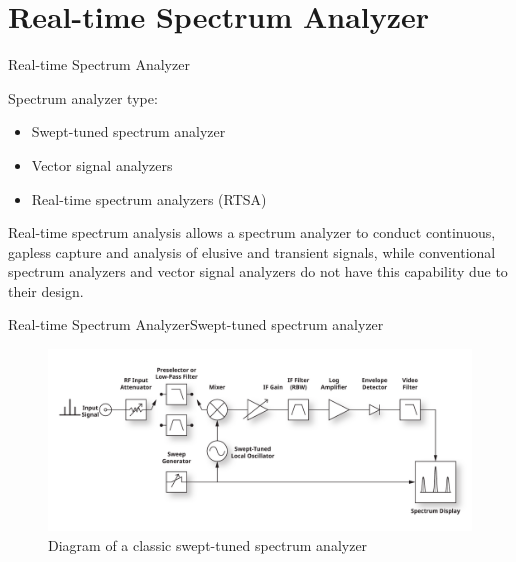 \section{Real-time Spectrum Analyzer}
\begin{frame}{Real-time Spectrum Analyzer}{}
	\begin{block}{Spectrum analyzer type:}
		\begin{itemize}
			\item Swept-tuned spectrum analyzer
			\item Vector signal analyzers
			\item Real-time spectrum analyzers (RTSA)
		\end{itemize}
	\end{block}
	\pause
	\begin{block}{}
		Real-time spectrum analysis allows a spectrum analyzer to conduct continuous,
		gapless capture and analysis of elusive and transient signals, while conventional
		spectrum analyzers and vector signal analyzers do not have this capability due to their design.
	\end{block}
\end{frame}
\begin{frame}{Real-time Spectrum Analyzer}{Swept-tuned spectrum analyzer}
	\begin{figure}
		\centering
		\includegraphics[scale=0.9]{graphics/rtsa_fig1_1.png}
		\caption{Diagram of a classic swept-tuned spectrum analyzer}
	\end{figure}
\end{frame}
